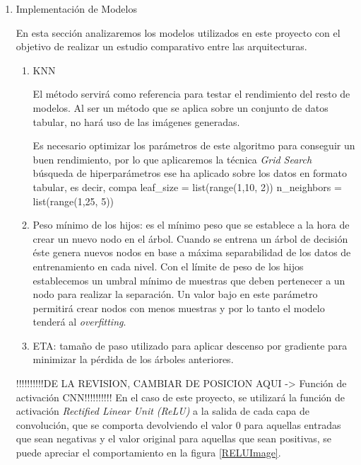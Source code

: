 \begin{enumerate}
        \item Implementación de Modelos

            En esta sección analizaremos los modelos utilizados en este proyecto con el objetivo de realizar un estudio comparativo entre las arquitecturas.

            

            \begin{enumerate}

                \item KNN

                    El método  servirá como referencia para testar el rendimiento del resto de modelos. Al ser un método que se aplica sobre un conjunto de datos tabular, no hará uso de las imágenes generadas.

                    Es necesario optimizar los parámetros de este algoritmo para conseguir un buen rendimiento, por lo que aplicaremos la técnica \textit{Grid Search} \cite{GridSearchSklearnLibrary} búsqueda de hiperparámetros ese ha aplicado sobre los datos en formato tabular, es decir, compa
                    leaf_size = list(range(1,10, 2))
                    n_neighbors = list(range(1,25, 5))

                \item Peso mínimo de los hijos: es el mínimo peso que se establece a la hora de crear un nuevo nodo en el árbol. Cuando se entrena un árbol de decisión éste genera nuevos nodos en base a máxima separabilidad de los datos de entrenamiento en cada nivel. Con el límite de peso de los hijos establecemos un umbral mínimo de muestras que deben pertenecer a un nodo para realizar la separación. Un valor bajo en este parámetro permitirá crear nodos con menos muestras y por lo tanto el modelo tenderá al \textit{overfitting}.

                \item ETA: tamaño de paso utilizado para aplicar descenso por gradiente para minimizar la pérdida de los árboles anteriores.

            \end{enumerate}
            !!!!!!!!!!DE LA REVISION, CAMBIAR DE POSICION AQUI -> Función de activación CNN!!!!!!!!!!
            En el caso de este proyecto, se utilizará la función de activación \textit{Rectified Linear Unit (ReLU)} a la salida de cada capa de convolución, que se comporta devolviendo el valor $0$ para aquellas entradas que sean negativas y el valor original para aquellas que sean positivas, se puede apreciar el comportamiento en la figura \ref{RELUImage}.


\end{enumerate}
